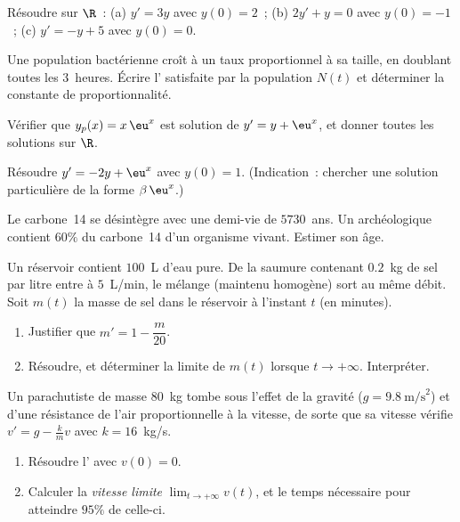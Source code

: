 \begin{exercise}[$\star$]\label{exo:g12:diffeq:1}
Résoudre sur $\R$~:
(a) $y' = 3y$ avec $y(0) = 2$~;\quad
(b) $2y' + y = 0$ avec $y(0) = -1$~;\quad
(c) $y' = -y + 5$ avec $y(0) = 0$.
\end{exercise}

\begin{exercise}[$\star$]\label{exo:g12:diffeq:2}
Une population bactérienne croît à un taux proportionnel à sa taille, en
doublant toutes les $3$~heures. Écrire l' satisfaite
par la population $N(t)$ et déterminer la constante de proportionnalité.
\end{exercise}

\begin{exercise}[$\star$]\label{exo:g12:diffeq:3}
Vérifier que $y_p(x) = x\,\eu^{x}$ est solution de $y' = y + \eu^x$, et
donner toutes les solutions sur $\R$.
\end{exercise}

\begin{exercise}[$\star\star$]\label{exo:g12:diffeq:4}
Résoudre $y' = -2y + \eu^{x}$ avec $y(0) = 1$.
(Indication~: chercher une solution particulière de la forme
$\beta\,\eu^{x}$.)
\end{exercise}

\begin{exercise}[$\star\star$]\label{exo:g12:diffeq:5}
Le carbone~14 se désintègre avec une demi-vie de $5730$~ans. Un 
archéologique contient $60\%$ du carbone~14 d'un organisme vivant. Estimer
son âge.
\end{exercise}

\begin{exercise}[$\star\star$]\label{exo:g12:diffeq:6}
Un réservoir contient $100$~L d'eau pure. De la saumure contenant $0.2$~kg de
sel par litre entre à $5$~L/min, le mélange (maintenu homogène) sort au même
débit. Soit $m(t)$ la masse de sel dans le réservoir à l'instant $t$ (en
minutes).
\begin{enumerate}
  \item Justifier que $m' = 1 - \dfrac{m}{20}$.
  \item Résoudre, et déterminer la limite de $m(t)$ lorsque
        $t \to +\infty$. Interpréter.
\end{enumerate}
\end{exercise}

\begin{exercise}[$\star\star$]\label{exo:g12:diffeq:7}
Un parachutiste de masse $80$~kg tombe sous l'effet de la gravité
($g = 9.8\ \text{m/s}^2$) et d'une résistance de l'air proportionnelle à la
vitesse, de sorte que sa vitesse vérifie $v' = g - \frac{k}{m}v$ avec
$k = 16$~kg/s.
\begin{enumerate}
  \item Résoudre l' avec $v(0) = 0$.
  \item Calculer la \emph{vitesse limite} $\lim_{t\to+\infty} v(t)$, et le
        temps nécessaire pour atteindre $95\%$ de celle-ci.
\end{enumerate}
\end{exercise}

